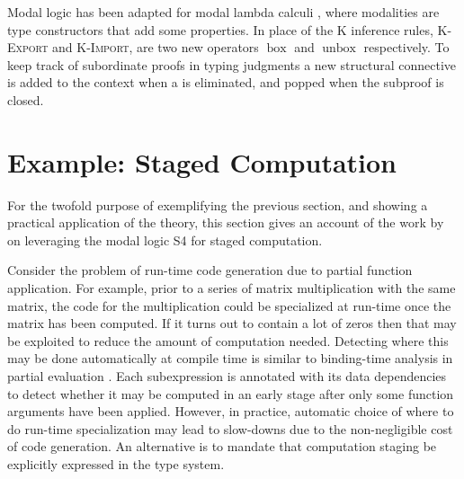 \documentclass[12pt,twoside,openright]{report}
\numberwithin{equation}{chapter}
\numberwithin{figure}{chapter}
\numberwithin{table}{chapter}
\theoremstyle{definition}\newtheorem{definition}{Definition}
\newcommand{\lock}{\text{\tikz[baseline]{
      \fill[rounded corners=.1ex] (-.75ex,0) rectangle (.75ex,1ex);
      \draw[line width=.3ex] (-.4ex,.5ex) -- ++(0,.75ex) arc (180:0:.4ex) -- ++(0,-.75ex);
}}}
\begin{document}
Modal logic has been adapted for modal lambda calculi \cite{borghuis94},
where modalities are type constructors that add some properties.
In place of the K inference rules, \textsc{K-Export} and \textsc{K-Import},
are two new operators $\operatorname{box}$ and $\operatorname{unbox}$ respectively.
To keep track of subordinate proofs in typing judgments
a new structural connective \lock{} is added to the context when a \Box{} is eliminated,
and popped when the subproof is closed.

\section{Example: Staged Computation}\label{sec:staged-computation}

For the twofold purpose of exemplifying the previous section,
and showing a practical application of the theory,
this section gives an account of the work by \textcite{davies01}
on leveraging the modal logic S4 for staged computation.

Consider the problem of run-time code generation due to partial function application.
For example, prior to a series of matrix multiplication with the same matrix,
the code for the multiplication could be specialized at run-time
once the matrix has been computed.
If it turns out to contain a lot of zeros then that may be exploited
to reduce the amount of computation needed.
Detecting where this may be done automatically at compile time
is similar to binding-time analysis in partial evaluation \cite{leone94}.
Each subexpression is annotated with its data dependencies
to detect whether it may be computed in an early stage
after only some function arguments have been applied.
However, in practice, automatic choice of where to do run-time specialization
may lead to slow-downs due to the non-negligible cost of code generation.
An alternative is to mandate that computation staging be explicitly expressed
in the type system.
\end{document}
